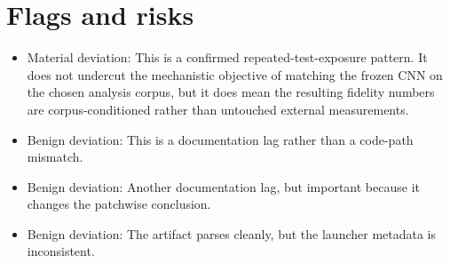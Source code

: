 \documentclass[11pt]{article}
\begin{document}
\section{Flags and risks}
\begin{itemize}
\item Material deviation: This is a confirmed repeated-test-exposure pattern. It does not undercut the mechanistic objective of matching the frozen CNN on the chosen analysis corpus, but it does mean the resulting fidelity numbers are corpus-conditioned rather than untouched external measurements.
\item Benign deviation: This is a documentation lag rather than a code-path mismatch.
\item Benign deviation: Another documentation lag, but important because it changes the patchwise conclusion.
\item Benign deviation: The artifact parses cleanly, but the launcher metadata is inconsistent.
\end{itemize}
\end{document}
